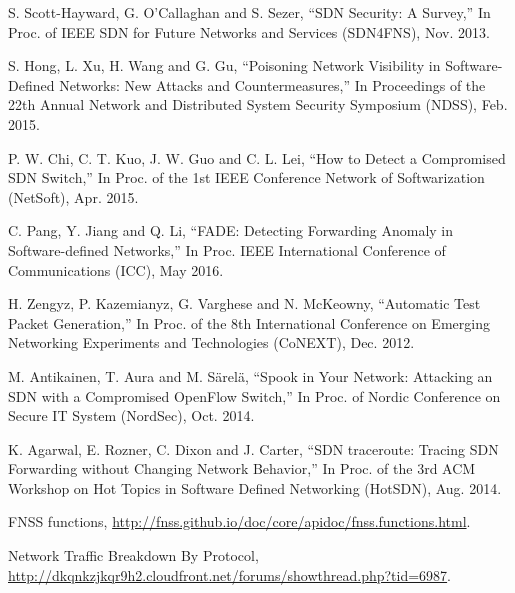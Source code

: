 \documentclass[conference]{IEEEtran}
\begin{document}



%
%
%
\begin{thebibliography}{1}

S. Scott-Hayward, G. O'Callaghan and S. Sezer,
``SDN Security: A Survey,'' In Proc. of IEEE SDN for Future Networks and Services (SDN4FNS), Nov. 2013.

S. Hong, L. Xu, H. Wang and G. Gu,
``Poisoning Network Visibility in Software-Defined Networks: New Attacks and Countermeasures,''  In Proceedings of the 22th Annual Network and Distributed System Security Symposium (NDSS), Feb. 2015.

P. W. Chi, C. T. Kuo, J. W. Guo and C. L. Lei,
``How to Detect a Compromised SDN Switch,'' In Proc. of the 1st IEEE Conference Network of Softwarization (NetSoft), Apr. 2015.

C. Pang, Y. Jiang and Q. Li,
``FADE: Detecting Forwarding Anomaly in Software-defined Networks,'' In Proc. IEEE International Conference of Communications (ICC), May 2016.

H. Zengyz, P. Kazemianyz, G. Varghese and N. McKeowny,
``Automatic Test Packet Generation,'' In Proc. of the 8th International Conference on Emerging Networking Experiments and Technologies (CoNEXT), Dec. 2012.

M. Antikainen, T. Aura and M. Särelä,
``Spook in Your Network: Attacking an SDN with a Compromised OpenFlow Switch,'' In Proc. of Nordic Conference on Secure IT System (NordSec), Oct. 2014.

K. Agarwal, E. Rozner, C. Dixon and J. Carter,
``SDN traceroute: Tracing SDN Forwarding without Changing Network Behavior,'' In Proc. of the 3rd ACM Workshop on Hot Topics in Software Defined Networking (HotSDN), Aug. 2014.

FNSS functions, \url{http://fnss.github.io/doc/core/apidoc/fnss.functions.html}.

Network Traffic Breakdown By Protocol, \url{http://dkqnkzjkqr9h2.cloudfront.net/forums/showthread.php?tid=6987}.
\end{thebibliography}
\end{document}
